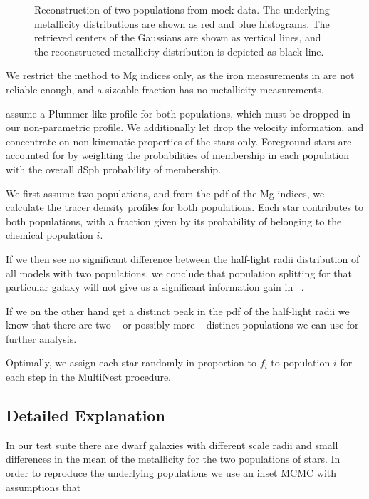 \begin{figure}
    \begin{center}
        \caption{Reconstruction of two populations from mock data. The
          underlying metallicity distributions are shown as red and
          blue histograms. The retrieved centers of the Gaussians are
          shown as vertical lines, and the reconstructed metallicity
          distribution is depicted as black line.}
        \label{fig:pymcmetal}
    \end{center}
\end{figure}

We restrict the method to Mg indices only, as the iron measurements in
\cite{WalkerPenarrubia2011} are not reliable enough, and a sizeable
fraction has no metallicity measurements.

\cite{WalkerPenarrubia2011} assume a Plummer-like profile for both
populations, which must be dropped in our non-parametric profile. We
additionally let drop the velocity information, and concentrate on
non-kinematic properties of the stars only. Foreground stars are
accounted for by weighting the probabilities of membership in each
population with the overall dSph probability of membership.

We first assume two populations, and from the pdf of the Mg indices,
we calculate the tracer density profiles for both populations. Each
star contributes to both populations, with a fraction given by its
probability of belonging to the chemical population $i$.

If we then see no significant difference between the half-light radii
distribution of all models with two populations, we conclude that
population splitting for that particular galaxy will not give us a
significant information gain in \GravImage\ .

If we on the other hand get a distinct peak in the pdf of the
half-light radii we know that there are two -- or possibly more --
distinct populations we can use for further analysis.

Optimally, we assign each star randomly in proportion to $f_i$ to
population $i$ for each step in the MultiNest procedure.


\subsection{Detailed Explanation}
In our test suite there are dwarf galaxies with different scale radii
and small differences in the mean of the metallicity for the two
populations of stars. In order to reproduce the underlying populations
we use an inset MCMC with assumptions that


